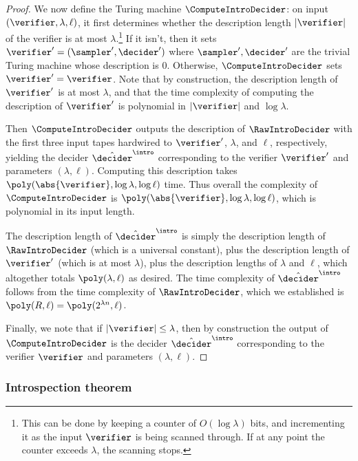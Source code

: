 \begin{proof}
  We now define the Turing machine $\ComputeIntroDecider$: on input
  $(\verifier,\lambda,\ell)$, it first determines whether the description length
	$|\verifier|$ of the verifier is at most $\lambda$.\footnote{This can be done by keeping a counter of $O(\log \lambda)$ bits, and incrementing it as the input $\verifier$ is being scanned through. If at any point the counter exceeds $\lambda$, the scanning stops.} If it isn't, then it sets $\verifier' = (\sampler',\decider')$ 
	where $\sampler',\decider'$ are the trivial Turing machine whose description is $0$. Otherwise,
  $\ComputeIntroDecider$ sets $\verifier' = \verifier$. Note that by construction, the description length of $\verifier'$ is at most $\lambda$, 
  and that the time complexity of computing the description of $\verifier'$ is polynomial in $|\verifier|$ and $\log \lambda$.
  
  Then $\ComputeIntroDecider$ outputs the description of
  $\RawIntroDecider$ with the first three input tapes hardwired to
  $\verifier'$, $\lambda$, and $\ell$, respectively, yielding the decider
  $\tdint$ corresponding to the verifier $\verifier'$ and
  parameters $(\lambda, \ell)$. 
  Computing this description takes $\poly(\abs{\verifier}, \log\lambda, \log
  \ell)$ time. Thus overall the complexity of $\ComputeIntroDecider$ is $\poly(\abs{\verifier},\log \lambda,\log \ell)$, which is polynomial in its input length.
  
   The description length of $\tdint$ is simply the description length of $\RawIntroDecider$ (which is a universal constant),
  plus the description length of $\verifier'$ (which is at most $\lambda$), plus the description lengths of $\lambda$ and $\ell$, which altogether
  totals $\poly(\lambda, \ell)$ as desired. The time complexity of $\tdint$ follows from the time complexity of $\RawIntroDecider$, which we established is $\poly(R, \ell) = \poly(2^{\lambda n},\ell)$.
  
  Finally, we note that if $|\verifier| \leq \lambda$, then by construction the output of $\ComputeIntroDecider$ is the decider $\tdint$ corresponding to the verifier $\verifier$ and parameters $(\lambda,\ell)$.
\end{proof}

\subsubsection{Introspection theorem}
\label{sec:intro-theorem}

